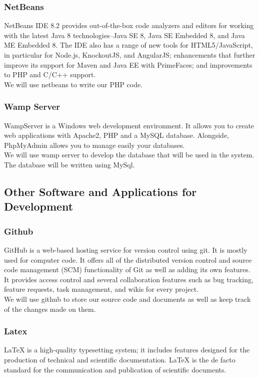 \documentclass[12pt]{article}
\begin{document}
		\subsubsection{NetBeans}
		NetBeans IDE 8.2 provides out-of-the-box code analyzers and editors for working with the latest Java 8 technologies--Java SE 8, Java SE Embedded 8, and Java ME Embedded 8. The IDE also has a range of new tools for HTML5/JavaScript, in particular for Node.js, KnockoutJS, and AngularJS; enhancements that further improve its support for Maven and Java EE with PrimeFaces; and improvements to PHP and C/C++ support.\cite{netbeans}  \\
		
		\noindent We will use netbeans to write our PHP code. 
		
		\subsubsection{Wamp Server}
		WampServer is a Windows web development environment. It allows you to create web applications with Apache2, PHP and a MySQL database. Alongside, PhpMyAdmin allows you to manage easily your databases.\\
		
		\noindent We will use wamp server to develop the database that will be used in the system. The database will be written using MySql.

		
	\subsection{Other Software and Applications for Development}
		\subsubsection{Github}
		GitHub  is a web-based hosting service for version control using git. It is mostly used for computer code. It offers all of the distributed version control and source code management (SCM) functionality of Git as well as adding its own features. It provides access control and several collaboration features such as bug tracking, feature requests, task management, and wikis for every project\cite{git}.\\
		
		\noindent We will use github to store our source code and documents as well as keep track of the changes made on them.
		 
		\subsubsection{Latex}
		LaTeX is a high-quality typesetting system; it includes features designed for the production of technical and scientific documentation. LaTeX is the de facto standard for the communication and publication of scientific documents\cite{latex}.\\
		
\end{document}
